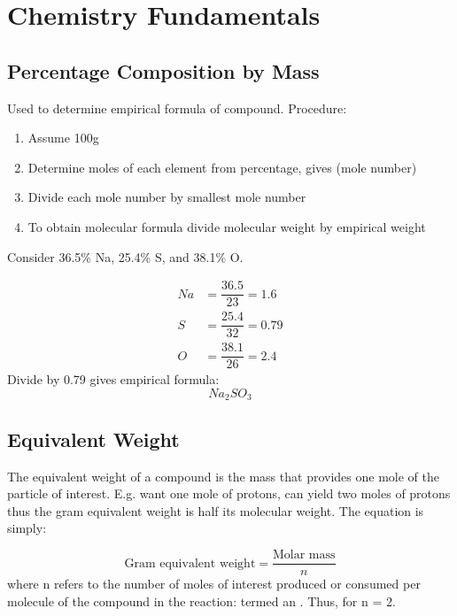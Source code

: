 \documentclass[../GChemReview.tex]{subfiles}
\begin{document}
\chapter{Chemistry Fundamentals}
\section{Percentage Composition by Mass}

Used to determine empirical formula of compound. Procedure:
\begin{enumerate}
  \item Assume 100g
  \item Determine moles of each element from percentage, gives
  (mole number) \item Divide each mole number by smallest mole
    number
  \item To obtain molecular formula divide molecular weight by
    empirical weight
\end{enumerate}

\begin{problem*}
  Consider 36.5\% Na, 25.4\% S, and 38.1\% O.
\end{problem*}
\begin{solution}
  \begin{align*}
    Na &= \dfrac{36.5}{23} = 1.6 \\
    S &= \dfrac{25.4}{32} = 0.79 \\
    O &= \dfrac{38.1}{26} = 2.4 
  \end{align*}
  Divide by 0.79 gives empirical formula:
  \[ Na_{2}SO_{3} \]
\end{solution}

\section{Equivalent Weight\supdag}

The equivalent weight of a compound is the mass that provides one mole of the
particle of interest. E.g. want one mole of protons,  can
yield two moles of protons thus the gram equivalent weight is half its molecular
weight. The equation is simply:

\begin{equation}
  \text{Gram equivalent weight} = \dfrac{\text{Molar mass}}{n}
\end{equation}
where n refers to the number of moles of interest produced or consumed
per molecule of the compound in the reaction: termed an .
Thus, for  n = 2.
\end{document}
